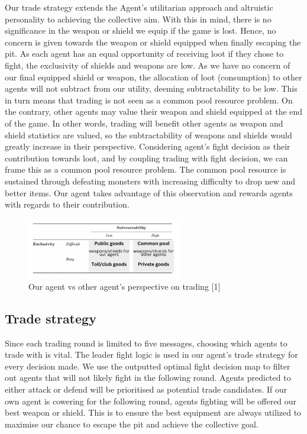 \noindent Our trade strategy extends the Agent’s utilitarian approach and altruistic personality to achieving the collective aim. With this in mind, there is no significance in the weapon or shield we equip if the game is lost. Hence, no concern is given towards the weapon or shield equipped when finally escaping the pit. As each agent has an equal opportunity of receiving loot if they chose to fight, the exclusivity of shields and weapons are low. As we have no concern of our final equipped shield or weapon, the allocation of loot (consumption) to other agents will not subtract from our utility, deeming subtractability to be low. This in turn means that trading is not seen as a common pool resource problem.
\noindent On the contrary, other agents may value their weapon and shield equipped at the end of the game. In other words, trading will benefit other agents as weapon and shield statistics are valued, so the subtractability of weapons and shields would greatly increase in their perspective.
Considering agent’s fight decision as their contribution towards loot, and by coupling trading with fight decision, we can frame this as a common pool resource problem. The common pool resource is sustained through defeating monsters with increasing difficulty to drop new and better items. Our agent takes advantage of this observation and rewards agents with regards to their contribution.

\begin{figure}[!ht]
    \centering
    \includegraphics[width=0.60\textwidth]{008_team_5_agent_design/images/13.png}
    \caption{Our agent vs other agent's perspective on trading [1]}
    \label{13}
\end{figure}

\subsection{Trade strategy}
Since each trading round is limited to five messages, choosing which agents to trade with is vital. The leader fight logic is used in our agent’s trade strategy for every decision made. We use the outputted optimal fight decision map to filter out agents that will not likely fight in the following round. Agents predicted to either attack or defend will be prioritised as potential trade candidates. If our own agent is cowering for the following round, agents fighting will be offered our best weapon or shield. This is to ensure the best equipment are always utilized to maximise our chance to escape the pit and achieve the collective goal.

